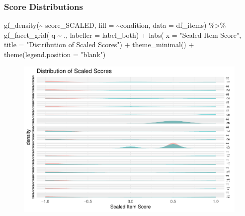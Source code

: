\documentclass[
  letterpaper,
  DIV=11,
  numbers=noendperiod]{scrreprt}
\newenvironment{Shaded}{\begin{snugshade}}{\end{snugshade}}
\newcommand{\AttributeTok}[1]{\textcolor[rgb]{0.40,0.45,0.13}{#1}}
\newcommand{\FunctionTok}[1]{\textcolor[rgb]{0.28,0.35,0.67}{#1}}
\newcommand{\NormalTok}[1]{\textcolor[rgb]{0.00,0.23,0.31}{#1}}
\newcommand{\SpecialCharTok}[1]{\textcolor[rgb]{0.37,0.37,0.37}{#1}}
\newcommand{\StringTok}[1]{\textcolor[rgb]{0.13,0.47,0.30}{#1}}
\begin{document}
\hypertarget{score-distributions}{%
\subsubsection{Score Distributions}\label{score-distributions}}

\begin{Shaded}
\begin{Highlighting}[]
\FunctionTok{gf\_density}\NormalTok{(}\SpecialCharTok{\textasciitilde{}}\NormalTok{ score\_SCALED, }\AttributeTok{fill =} \SpecialCharTok{\textasciitilde{}}\NormalTok{condition, }\AttributeTok{data =}\NormalTok{ df\_items) }\SpecialCharTok{\%\textgreater{}\%} 
  \FunctionTok{gf\_facet\_grid}\NormalTok{( q }\SpecialCharTok{\textasciitilde{}}\NormalTok{ ., }\AttributeTok{labeller =}\NormalTok{ label\_both) }\SpecialCharTok{+} 
  \FunctionTok{labs}\NormalTok{( }\AttributeTok{x =} \StringTok{"Scaled Item Score"}\NormalTok{, }\AttributeTok{title =} \StringTok{"Distribution of Scaled Scores"}\NormalTok{) }\SpecialCharTok{+} \FunctionTok{theme\_minimal}\NormalTok{() }\SpecialCharTok{+} \FunctionTok{theme}\NormalTok{(}\AttributeTok{legend.position =} \StringTok{"blank"}\NormalTok{)}
\end{Highlighting}
\end{Shaded}

\begin{figure}[H]

{\centering \includegraphics{analysis/SGC3A/2_sgc3A_scoring_files/figure-pdf/unnamed-chunk-79-1.pdf}

}

\end{figure}
\end{document}
